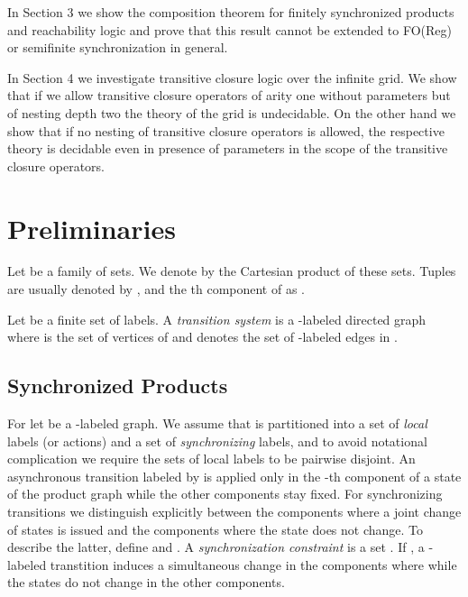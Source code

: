 \documentclass{LMCS}
\begin{document}
In Section 3 we show the composition theorem for finitely synchronized 
products and reachability logic and prove that this result cannot be extended 
to FO(Reg) or semifinite synchronization in general.

In Section 4 we investigate transitive closure logic over the infinite grid.
We show that if we allow transitive closure operators of arity one without 
parameters but of nesting depth two the theory of the grid is undecidable.
On the other hand we show that if no nesting of transitive closure operators is
allowed, the respective theory is decidable even in presence of parameters
in the scope of the transitive closure operators. 

\section{Preliminaries}

Let  be a family of sets. We denote by 
 the Cartesian product of these sets.
Tuples  are usually denoted
by , and the th component of  as  .

Let  be a finite set of labels. A \emph{transition system} is a 
-labeled directed graph  where  
is the set of vertices of  and 
denotes the set of -labeled edges in .















\subsection{Synchronized Products}

For  let  be a 
-labeled graph. We assume that  is partitioned into
a set  of \emph{local} labels (or actions) and a set  of
\emph{synchronizing} labels, and to avoid notational complication we require 
the sets of local labels to be pairwise disjoint. An asynchronous transition 
labeled by  is applied only in the -th component of a
state  of the product graph while the other components stay 
fixed. For synchronizing transitions we distinguish explicitly between the 
components where a joint change of states is issued and the components where the 
state does not change. To describe the latter, define
 and . A \emph{synchronization constraint} is a set . If , a -labeled 
transtition induces a simultaneous change in the components  where 
while the states do not change in the other components.
\end{document}

